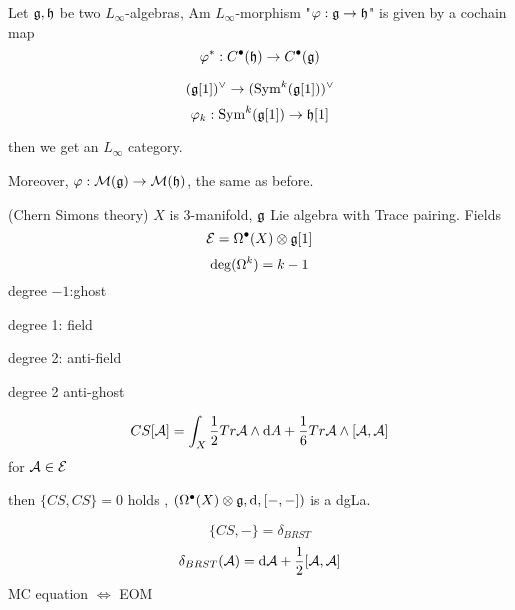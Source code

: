 \begin{definition}
Let $\mathfrak{g},\mathfrak{h}$ be two $L_\infty$-algebras, 
Am $L_\infty$-morphism "$\varphi:\mathfrak{g}\to\mathfrak{h}$" is given by a cochain 
map
$$\varphi^*:C^{\bullet}(\mathfrak{h})\to C^{\bullet}(\mathfrak{g})$$

$$(\mathfrak{g}[1])^\vee\to(\operatorname{Sym}^k(\mathfrak{g}[1]))^\vee$$
$$\varphi_k:\operatorname{Sym}^k(\mathfrak{g}[1])\to\mathfrak{h}[1]$$

\end{definition}

then we get an $L_\infty$ category.

Moreover, $\varphi:\mathcal{M}(\mathfrak{g})\to\mathcal{M}(\mathfrak{h})$,
the same as before.

\begin{example}(Chern Simons theory)
$X$ is 3-manifold, $\mathfrak{g}$ Lie algebra with Trace pairing.
Fields
$$\mathcal{E}=\Omega^{\bullet}(X)\otimes\mathfrak{g}[1]$$
$$\deg(\Omega^k)=k-1$$
degree $-1$:ghost

degree 1: field

degree 2: anti-field

degree 2 anti-ghost

$$CS[\mathcal{A}]=\int_X\frac{1}{2}Tr\mathcal{A}\wedge\mathrm{d} A+\frac{1}{6}Tr\mathcal{A}\wedge[\mathcal{A},\mathcal{A}]$$
for $\mathcal{A}\in\mathcal{E}$

then $\{CS,CS\}=0$ holds ,
$(\Omega^{\bullet}(X)\otimes\mathfrak{g},\mathrm{d},[-,-])$ is a dgLa.

$$\{CS,-\}=\delta_{BRST}$$
$$\delta_{BRST}(\mathcal{A})=\mathrm{d} \mathcal{A}+\frac{1}{2}[\mathcal{A},\mathcal{A}]$$
MC equation $\iff$ EOM
\end{example}



